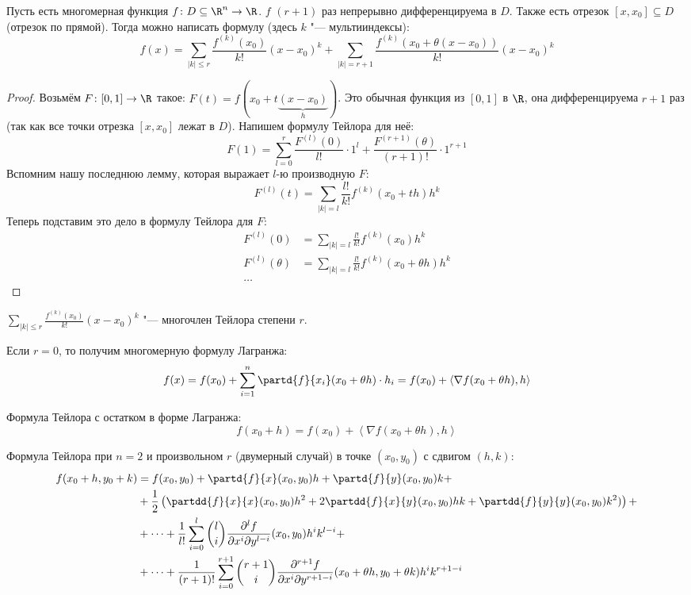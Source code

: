 
\begin{theorem}
	Пусть есть многомерная функция $f \colon D \subseteq \R^n \to \R$.
	$f$ $(r+1)$ раз непрерывно дифференцируема в $D$.
	Также есть отрезок $[x, x_0] \subseteq D$ (отрезок по прямой).
	Тогда можно написать формулу (здесь $k$ "--- мультииндексы):
	\[ f(x) = \sum_{|k| \le r} \frac{f^{(k)}(x_0)}{k!} (x - x_0)^k + \sum_{|k| = r + 1} \frac{f^{(k)}(x_0+\theta(x-x_0))}{k!} (x-x_0)^k\]
\end{theorem}
\begin{proof}
	Возьмём $F \colon [0, 1] \to \R$ такое: $F(t)=f(x_0+t\underbrace{(x-x_0)}_{h})$.
	Это обычная функция из $[0, 1]$ в $\R$, она дифференцируема $r+1$ раз (так как все точки отрезка $[x, x_0]$ лежат в $D$).
	Напишем формулу Тейлора для неё:
	\[ F(1) = \sum_{l=0}^r \frac{F^{(l)}(0)}{l!} \cdot 1^l + \frac{F^{(r+1)}(\theta)}{(r+1)!} \cdot 1 ^ {r+1}\]
	Вспомним нашу последнюю лемму, которая выражает $l$-ю производную $F$:
	\[ F^{(l)}(t) = \sum_{|k| = l} \frac{l!}{k!} f^{(k)}(x_0+th) h^k\]
	Теперь подставим это дело в формулу Тейлора для $F$:
	\begin{align*}
	F^{(l)}(0) &= \sum_{|k| = l} \frac{l!}{k!} f^{(k)}(x_0) h^k \\
	F^{(l)}(\theta) &= \sum_{|k| = l} \frac{l!}{k!} f^{(k)}(x_0 + \theta h) h^k \\
	\dots
	\end{align*}
\end{proof}
\begin{Rem}
	$\sum_{|k|\le r} \frac{f^{(k)} (x_0)}{k!} (x - x_0) ^ k$ "--- многочлен Тейлора степени $r$.
\end{Rem}
\begin{Rem}
	Если $r=0$, то получим многомерную формулу Лагранжа:
	\[f(x) = f(x_0) + \sum_{i=1}^n \partd{f}{x_i} (x_0+\theta h) \cdot h_i = f(x_0) + \left< \nabla f(x_0+\theta h), h \right>\]
\end{Rem}
\begin{conseq}
	Формула Тейлора с остатком в форме Лагранжа:
	\[ f(x_0 + h) = f(x_0) + \left< \nabla f (x_0+\theta h), h \right> \]
\end{conseq}
\begin{Rem}
	Формула Тейлора при $n=2$ и произвольном $r$ (двумерный случай) в точке $(x_0, y_0)$ с сдвигом $(h, k)$:
	\begin{align*}
		f(x_0+h, y_0+k)
			&= f(x_0, y_0)
			+ \partd{f}{x}(x_0, y_0)h + \partd{f}{y}(x_0, y_0)k + \\
			&+ \frac12\left(
				   \partdd{f}{x}{x} (x_0, y_0) h^2
				+ 2\partdd{f}{x}{y} (x_0, y_0) hk
				+  \partdd{f}{y}{y} (x_0, y_0) k^2)
			\right) + \\
			&+ \dots
			+ \frac{1}{    l!} \sum_{i=0}^l     \binom{l  }{i} \frac{\partial^l     f}{\partial x^i \partial y^{l  -i}} (x_0, y_0)                   h^i k^{l  -i} + \\
			&+ \dots
			+ \frac{1}{(r+1)!} \sum_{i=0}^{r+1} \binom{r+1}{i} \frac{\partial^{r+1} f}{\partial x^i \partial y^{r+1-i}} (x_0+\theta h, y_0+\theta k) h^i k^{r+1-i}
	\end{align*}
\end{Rem}

